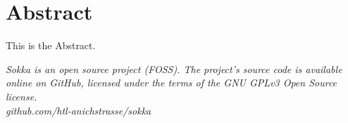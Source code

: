 \section*{Abstract}

This is the Abstract.

\textit{Sokka is an open source project (FOSS). The project's source code is available online on GitHub, licensed under the terms of the GNU GPLv3 Open Source license.\\github.com/htl-anichstrasse/sokka}

\newpage